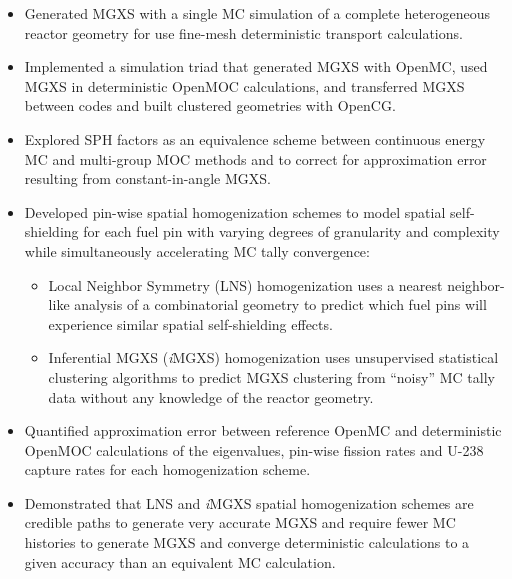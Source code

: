 \begin{emphbox}
\begin{itemize}
\item Generated \ac{MGXS} with a single \ac{MC} simulation of a complete heterogeneous reactor geometry for use fine-mesh deterministic transport calculations.
\item Implemented a simulation triad that generated \ac{MGXS} with OpenMC, used \ac{MGXS} in deterministic OpenMOC calculations, and transferred \ac{MGXS} between codes and built clustered geometries with OpenCG.
\item Explored \ac{SPH} factors as an equivalence scheme between continuous energy \ac{MC} and multi-group \ac{MOC} methods and to correct for approximation error resulting from constant-in-angle \ac{MGXS}.
\item Developed pin-wise spatial homogenization schemes to model spatial self-shielding for each fuel pin with varying degrees of granularity and complexity while simultaneously accelerating \ac{MC} tally convergence:
\begin{itemize}
  \item Local Neighbor Symmetry (LNS) homogenization uses a nearest neighbor-like analysis of a combinatorial geometry to predict which fuel pins will experience similar spatial self-shielding effects.
  \item Inferential \ac{MGXS} (\textit{i}\ac{MGXS}) homogenization uses unsupervised statistical clustering algorithms to predict \ac{MGXS} clustering from ``noisy'' \ac{MC} tally data without any knowledge of the reactor geometry.
\end{itemize}
\item Quantified approximation error between reference OpenMC and deterministic OpenMOC calculations of the eigenvalues, pin-wise fission rates and U-238 capture rates for each homogenization scheme.
\item Demonstrated that \ac{LNS} and \textit{i}\ac{MGXS} spatial homogenization schemes are credible paths to generate very accurate \ac{MGXS} and require fewer \ac{MC} histories to generate \ac{MGXS} and converge deterministic calculations to a given accuracy than an equivalent \ac{MC} calculation.
\end{itemize}
\end{emphbox}

